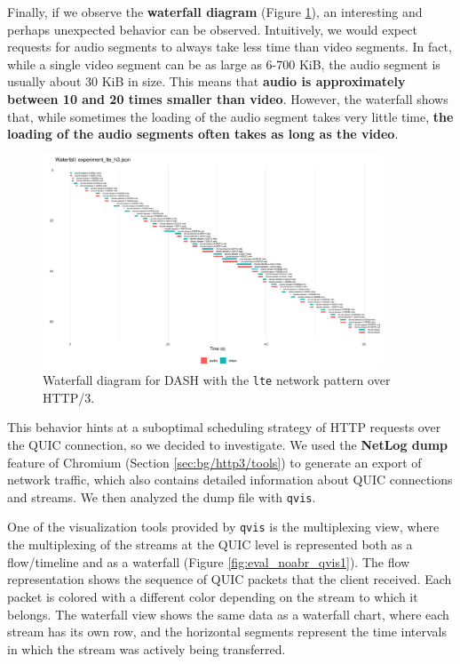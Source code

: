 Finally, if we observe the \textbf{waterfall diagram} (Figure \ref{fig:eval_nonabr_lte_h3_waterfall}), an interesting and perhaps unexpected behavior can be observed. Intuitively, we would expect requests for audio segments to always take less time than video segments. In fact, while a single video segment can be as large as 6-700 KiB, the audio segment is usually about 30 KiB in size. This means that \textbf{audio is approximately between 10 and 20 times smaller than video}. However, the waterfall shows that, while sometimes the loading of the audio segment takes very little time, \textbf{the loading of the audio segments often takes as long as the video}.

\begin{figure}[h]
    \centering
    \includegraphics[width=0.9\textwidth]{res/eval_nonabr_lte_h3_waterfall.png}
    \caption{Waterfall diagram for DASH with the \texttt{lte} network pattern over HTTP/3.}
    \label{fig:eval_nonabr_lte_h3_waterfall}
\end{figure}

This behavior hints at a suboptimal scheduling strategy of HTTP requests over the QUIC connection, so we decided to investigate. We used the \textbf{NetLog dump} feature of Chromium (Section \ref{sec:bg/http3/tools}) to generate an export of network traffic, which also contains detailed information about QUIC connections and streams. We then analyzed the dump file with \texttt{qvis}.

One of the visualization tools provided by \texttt{qvis} is the multiplexing view, where the multiplexing of the streams at the QUIC level is represented both as a flow/timeline and as a waterfall (Figure \ref{fig:eval_noabr_qvis1}). The flow representation shows the sequence of QUIC packets that the client received. Each packet is colored with a different color depending on the stream to which it belongs. The waterfall view shows the same data as a waterfall chart, where each stream has its own row, and the horizontal segments represent the time intervals in which the stream was actively being transferred.


